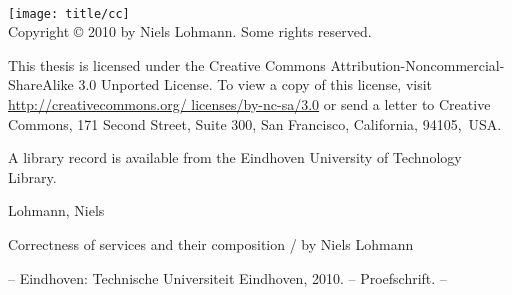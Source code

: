 \begin{titlepage}
    \begin{center}
        \large

        \hfill

        \vfill

        \begingroup
    \\ \bigskip
        \endgroup


        \vfill

        \vfill

    \end{center}
\end{titlepage}

\thispagestyle{empty}
\small

${}$\vfill

\begin{center}
  \centering
  \texttt{[image: title/cc]}\\Copyright \copyright{} 2010 by Niels Lohmann. Some rights reserved.
\end{center}
\vspace{-0.5em}
\noindent This thesis is licensed under the Creative Commons Attribution-Noncommercial-Share\break Alike 3.0 Unported License. To view a copy of this license, visit \href{http://creativecommons.org/licenses/by-nc-sa/3.0}{http:/\!/creativecommons.org/ licenses/by-nc-sa/3.0} or send a letter to Creative Commons, 171 Second Street, Suite 300, San Francisco, California, 94105,~{\footnotesize USA}.

\vspace{3em}

\noindent A library record is available from the Eindhoven University of Technology Library.\bigskip

\noindent Lohmann, Niels\medskip

\noindent Correctness of services and their composition / by Niels Lohmann

\noindent -- Eindhoven: Technische Universiteit Eindhoven, 2010. -- Proefschrift. --\medskip

